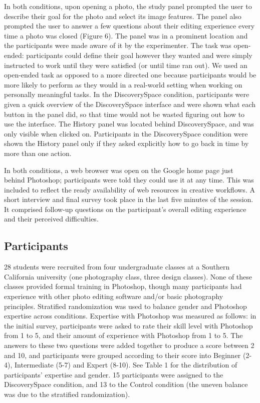 In both conditions, upon opening a photo, the study panel prompted the user to describe their goal for the photo and select its image features. The panel also prompted the user to answer a few questions about their editing experience every time a photo was closed (Figure 6). The panel was in a prominent location and the participants were made aware of it by the experimenter. The task was open-ended: participants could define their goal however they wanted and were simply instructed to work until they were satisfied (or until time ran out).  We used an open-ended task as opposed to a more directed one because participants would be more likely to perform as they would in a real-world setting when working on personally meaningful tasks. In the Discovery\-Space condition, participants were given a quick overview of the Discovery\-Space interface and were shown what each button in the panel did, so that time would not be wasted figuring out how to use the interface. The History panel was located behind Discovery\-Space, and was only visible when clicked on. Participants in the Discovery\-Space condition were shown the History panel only if they asked explicitly how to go back in time by more than one action. 

In both conditions, a web browser was open on the Google home page just behind Photoshop; participants were told they could use it at any time. This was included to reflect the ready availability of web resources in creative workflows. A short interview and final survey took place in the last five minutes of the session. It comprised follow-up questions on the participant's overall editing experience and their perceived difficulties. 

\subsection{Participants}
28 students were recruited from four undergraduate classes at a Southern California university (one photography class, three design classes). None of these classes provided formal training in Photoshop, though many participants had experience with other photo editing software and/or basic photography principles. Stratified randomization was used to balance gender and Photoshop expertise across conditions. Expertise with Photoshop was measured as follows: in the initial survey, participants were asked to rate their skill level with Photoshop from 1 to 5, and their amount of experience with Photoshop from 1 to 5. The answers to these two questions were added together to produce a score between 2 and 10, and participants were grouped according to their score into Beginner (2-4), Intermediate (5-7) and Expert (8-10). See Table 1 for the distribution of participants' expertise and gender. 15 participants were assigned to the Discovery\-Space condition, and 13 to the Control condition (the uneven balance was due to the stratified randomization).

